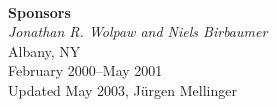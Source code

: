 \begin{titlepage}
\begin{minipage}{\textwidth}
\begin{center}
\begin{minipage}{13cm}
\begin{minipage}[c]{3cm}
  \end{minipage}
\end{minipage}
%
\\[0.5cm]
\textbf{Sponsors} \\
\textit{Jonathan R. Wolpaw and Niels Birbaumer}
\\[1.0cm]
{Albany, NY} \\[1ex]
{February 2000--May 2001}
\\[1ex]Updated May 2003, J\"urgen Mellinger
\end{center}
\end{minipage}
\end{titlepage}
